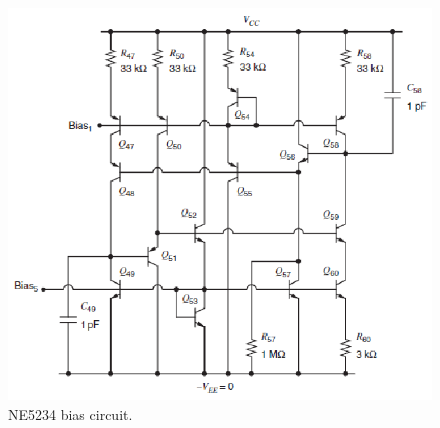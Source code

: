 \documentclass[12pt,a4paper,final,headinclude,footinclude,BCOR5mm]{scrartcl}
\begin{document}
\begin{figure}[!h]
\begin{center}
\includegraphics[width=400pt]{./imagenes/polne5234.png}
\end{center}
\caption{NE5234 bias circuit.}
\label{634}
\end{figure}
\end{document}
